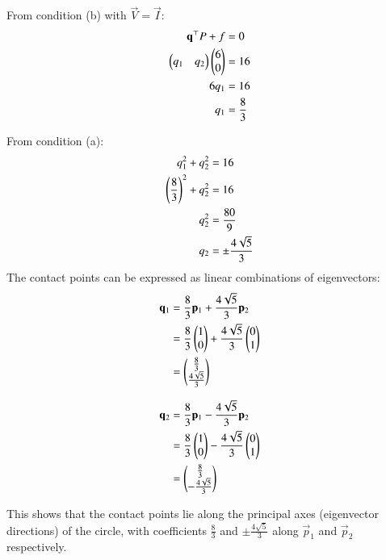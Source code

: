 \documentclass[article]{IEEEtran}
\begin{document}
	From condition (b) with $\vec{V} = \vec{I}$:
	\begin{align}
		\mathbf{q}^\top P + f &= 0\\
		\begin{pmatrix}q_1 & q_2\end{pmatrix}\begin{pmatrix}6\\0\end{pmatrix} &= 16\\
		6q_1 &= 16\\
		q_1 &= \frac{8}{3}
	\end{align}
	
	From condition (a):
	\begin{align}
		q_1^2 + q_2^2 &= 16\\
		\left(\frac{8}{3}\right)^2 + q_2^2 &= 16\\
		q_2^2 &= \frac{80}{9}\\
		q_2 &= \pm\frac{4\sqrt{5}}{3}
	\end{align}
	The contact points can be expressed as linear combinations of eigenvectors:
	\begin{align}
		\mathbf{q}_1 &= \frac{8}{3}\mathbf{p}_1 + \frac{4\sqrt{5}}{3}\mathbf{p}_2\\
		&= \frac{8}{3}\begin{pmatrix}1\\0\end{pmatrix} + \frac{4\sqrt{5}}{3}\begin{pmatrix}0\\1\end{pmatrix}\\
		&= \begin{pmatrix}\frac{8}{3}\\\frac{4\sqrt{5}}{3}\end{pmatrix}
	\end{align}
	
	\begin{align}
		\mathbf{q}_2 &= \frac{8}{3}\mathbf{p}_1 - \frac{4\sqrt{5}}{3}\mathbf{p}_2\\
		&= \frac{8}{3}\begin{pmatrix}1\\0\end{pmatrix} - \frac{4\sqrt{5}}{3}\begin{pmatrix}0\\1\end{pmatrix}\\
		&= \begin{pmatrix}\frac{8}{3}\\-\frac{4\sqrt{5}}{3}\end{pmatrix}
	\end{align}
	
	This shows that the contact points lie along the principal axes (eigenvector directions) of the circle, with coefficients $\frac{8}{3}$ and $\pm\frac{4\sqrt{5}}{3}$ along $\vec{p}_1$ and $\vec{p}_2$ respectively.
	
\end{document}
